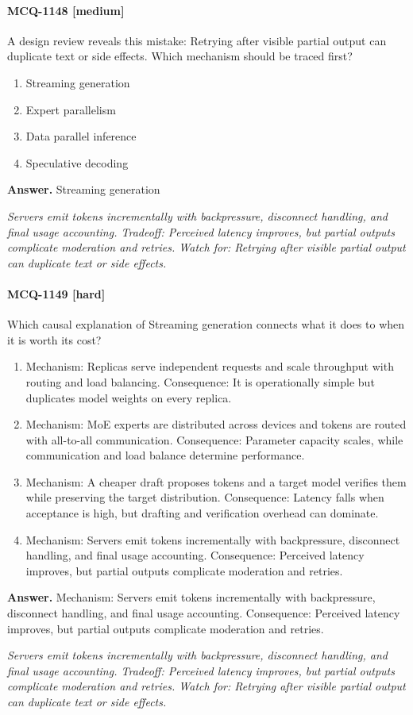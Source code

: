 \paragraph{MCQ-1148 [medium]} A design review reveals this mistake: Retrying after visible partial output can duplicate text or side effects. Which mechanism should be traced first?
\begin{enumerate}[label=\Alph*.]
\item Streaming generation
\item Expert parallelism
\item Data parallel inference
\item Speculative decoding
\end{enumerate}
\noindent\textbf{Answer.} Streaming generation
\par\textit{Servers emit tokens incrementally with backpressure, disconnect handling, and final usage accounting. Tradeoff: Perceived latency improves, but partial outputs complicate moderation and retries. Watch for: Retrying after visible partial output can duplicate text or side effects.}
\paragraph{MCQ-1149 [hard]} Which causal explanation of Streaming generation connects what it does to when it is worth its cost?
\begin{enumerate}[label=\Alph*.]
\item Mechanism: Replicas serve independent requests and scale throughput with routing and load balancing. Consequence: It is operationally simple but duplicates model weights on every replica.
\item Mechanism: MoE experts are distributed across devices and tokens are routed with all-to-all communication. Consequence: Parameter capacity scales, while communication and load balance determine performance.
\item Mechanism: A cheaper draft proposes tokens and a target model verifies them while preserving the target distribution. Consequence: Latency falls when acceptance is high, but drafting and verification overhead can dominate.
\item Mechanism: Servers emit tokens incrementally with backpressure, disconnect handling, and final usage accounting. Consequence: Perceived latency improves, but partial outputs complicate moderation and retries.
\end{enumerate}
\noindent\textbf{Answer.} Mechanism: Servers emit tokens incrementally with backpressure, disconnect handling, and final usage accounting. Consequence: Perceived latency improves, but partial outputs complicate moderation and retries.
\par\textit{Servers emit tokens incrementally with backpressure, disconnect handling, and final usage accounting. Tradeoff: Perceived latency improves, but partial outputs complicate moderation and retries. Watch for: Retrying after visible partial output can duplicate text or side effects.}
